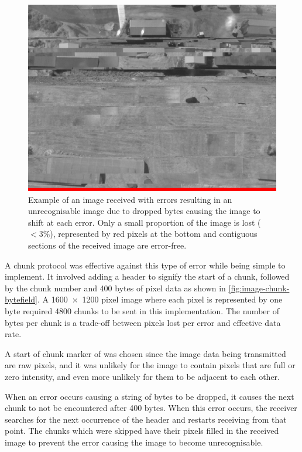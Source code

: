 \documentclass{report}
\begin{document}
\begin{figure}[H]
  \centering
  \includegraphics[width=\linewidth]{images/results/sheds_naive.png}
  \caption{Example of an image received with errors resulting in an unrecognisable image due to dropped bytes causing the image to shift at each error. Only a small proportion of the image is lost ($<3\%$), represented by red pixels at the bottom and contiguous sections of the received image are error-free.}
  \label{fig:image-sheds-error-demo}
\end{figure}

A chunk protocol was effective against this type of error while being simple to implement. It involved adding a header to signify the start of a chunk, followed by the chunk number and 400 bytes of pixel data as shown in \ref{fig:image-chunk-bytefield}. A \SI{1600x1200}{} pixel image where each pixel is represented by one byte required 4800 chunks to be sent in this implementation. The number of bytes per chunk is a trade-off between pixels lost per error and effective data rate.

A start of chunk marker of \texttt{} was chosen since the image data being transmitted are raw pixels, and it was unlikely for the image to contain pixels that are full or zero intensity, and even more unlikely for them to be adjacent to each other.

When an error occurs causing a string of bytes to be dropped, it causes the next chunk to not be encountered after 400 bytes. When this error occurs, the receiver searches for the next occurrence of the header and restarts receiving from that point. The chunks which were skipped have their pixels filled in the received image to prevent the error causing the image to become unrecognisable.
\end{document}

